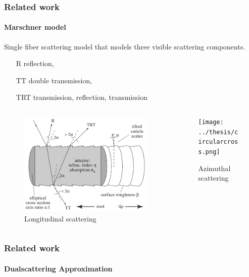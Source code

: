 \documentclass{beamer}
\begin{document}
    \begin{frame}
    \frametitle{Related work}
    \framesubtitle{Marschner model}
    Single fiber scattering model that models three visible scattering components.
    \begin{itemize}
    \centering
    \item[R] reflection,
    \item[TT] double transmission,
    \item[TRT] transmission, reflection, transmission
    \end{itemize}
    
    \begin{columns}[onlytextwidth]
    \begin{column}{.45\textwidth}
    \begin{figure}
    	\includegraphics[scale=0.20]{../thesis/images/marschner_model_longitudinal.png}
    	\caption{Longitudinal scattering}
    \end{figure}
    \end{column}
    \hfill
    \begin{column}{.45\textwidth}
    \begin{figure}
    	\texttt{[image: ../thesis/circularcross.png]}
    	\caption{Azimuthal scattering}
    \end{figure}
    \end{column}
    \end{columns}
  \end{frame}
  
  \begin{frame}
    \frametitle{Related work}
    \framesubtitle{Dualscattering Approximation}
  \end{frame}
  
\end{document}
